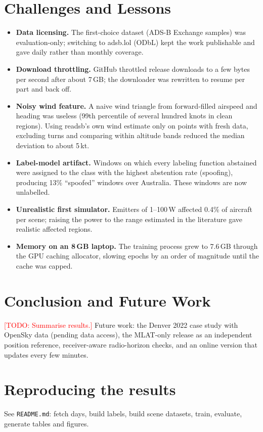 \documentclass[12pt,a4paper,oneside]{report}
\newcommand{\todo}[1]{\textcolor{red}{[TODO: #1]}}
\begin{document}
\chapter{Challenges and Lessons}
\begin{itemize}
\item \textbf{Data licensing.} The first-choice dataset (ADS-B Exchange samples) was evaluation-only; switching to adsb.lol
(ODbL) kept the work publishable and gave daily rather than monthly coverage.
\item \textbf{Download throttling.} GitHub throttled release downloads to a few bytes per second after about 7\,GB; the
downloader was rewritten to resume per part and back off.
\item \textbf{Noisy wind feature.} A naive wind triangle from forward-filled airspeed and heading was useless (99th percentile
of several hundred knots in clean regions). Using readsb's own wind estimate only on points with fresh data, excluding
turns and comparing within altitude bands reduced the median deviation to about 5\,kt.
\item \textbf{Label-model artifact.} Windows on which every labeling function abstained were assigned to the class with the
highest abstention rate (spoofing), producing 13\% ``spoofed'' windows over Australia. These windows are now unlabelled.
\item \textbf{Unrealistic first simulator.} Emitters of 1--100\,W affected 0.4\% of aircraft per scene; raising the power to
the range estimated in the literature gave realistic affected regions.
\item \textbf{Memory on an 8\,GB laptop.} The training process grew to 7.6\,GB through the GPU caching allocator, slowing
epochs by an order of magnitude until the cache was capped.
\end{itemize}

\chapter{Conclusion and Future Work}
\todo{Summarise results.} Future work: the Denver 2022 case study with OpenSky data (pending data access), the MLAT-only
release as an independent position reference, receiver-aware radio-horizon checks, and an online version that updates
every few minutes.




\appendix
\chapter{Reproducing the results}
See \texttt{README.md}: fetch days, build labels, build scene datasets, train, evaluate, generate tables and figures.
\end{document}
